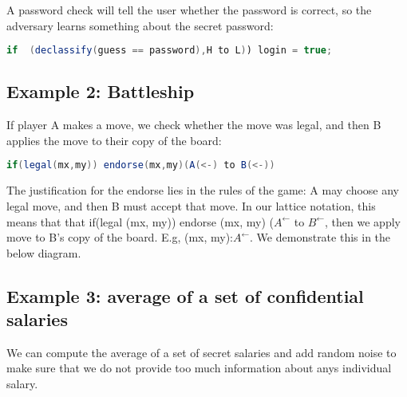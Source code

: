 \documentclass{article}
\begin{document}
A password check will tell the user whether the password is correct, so the adversary learns something about the secret password:

\begin{lstlisting}[language=Java]
    if  (declassify(guess == password),H to L)) login = true;
\end{lstlisting}

\subsection*{Example 2: Battleship}

If player A makes a move, we check whether the move was legal, and then B applies the move to their copy of the board:

\begin{lstlisting}[language=Java]
    if(legal(mx,my)) endorse(mx,my)(A(<-) to B(<-))
\end{lstlisting}

The justification for the endorse lies in the rules of the game: A may choose any legal move, and then B must accept that move. In our lattice notation, this means that that if(legal (mx, my)) endorse (mx, my) ($A^{\leftarrow{}}$ to $B^{\leftarrow{}}$, then we apply move to B's copy of the board. E.g, (mx, my):$A^{\leftarrow{}}$. We demonstrate this in the below diagram.
\newline
{}

\subsection*{Example 3: average of a set of confidential salaries}

We can compute the average of a set of secret salaries and add random noise to make sure that we do not provide too much information about anys individual salary.
\end{document}
